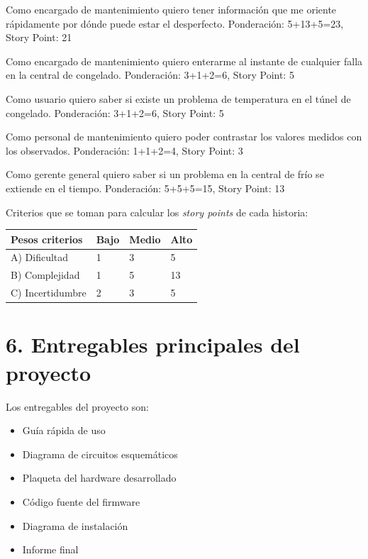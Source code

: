 \documentclass[
11pt, %
]{charter}
\begin{document}
Como encargado de mantenimiento quiero tener información que me oriente rápidamente por dónde puede estar el desperfecto. Ponderación: 5+13+5=23, Story Point: 21

Como encargado de mantenimiento quiero enterarme al instante de cualquier falla en la central de congelado. Ponderación: 3+1+2=6, Story Point: 5

Como usuario quiero saber si existe un problema de temperatura en el túnel de congelado. Ponderación: 3+1+2=6, Story Point: 5

Como personal de mantenimiento quiero poder contrastar los valores medidos con los observados. Ponderación: 1+1+2=4, Story Point: 3

Como gerente general quiero saber si un problema en la central de frío se extiende en el tiempo. Ponderación: 5+5+5=15, Story Point: 13


Criterios que se toman para calcular los \textit{story points} de cada historia:

\begin{table}[ht]
\begin{tabularx}{\linewidth}{@{}|X|X|X|X|@{}}
\hline
\rowcolor[HTML]{C0C0C0} 
Pesos criterios  & Bajo & Medio	& Alto \\ \hline
A) Dificultad    & 1    & 3      & 5 \\ \hline
B) Complejidad   & 1    & 5      & 13 \\ \hline
C) Incertidumbre & 2	    & 3      & 5	 \\ \hline
\end{tabularx}
\end{table}

\section{6. Entregables principales del proyecto}
\label{sec:entregables}
Los entregables del proyecto son:
\begin{itemize}
	\item Guía rápida de uso
	\item Diagrama de circuitos esquemáticos
	\item Plaqueta del hardware desarrollado
	\item Código fuente del firmware
	\item Diagrama de instalación
	\item Informe final
\end{itemize}
\end{document}
